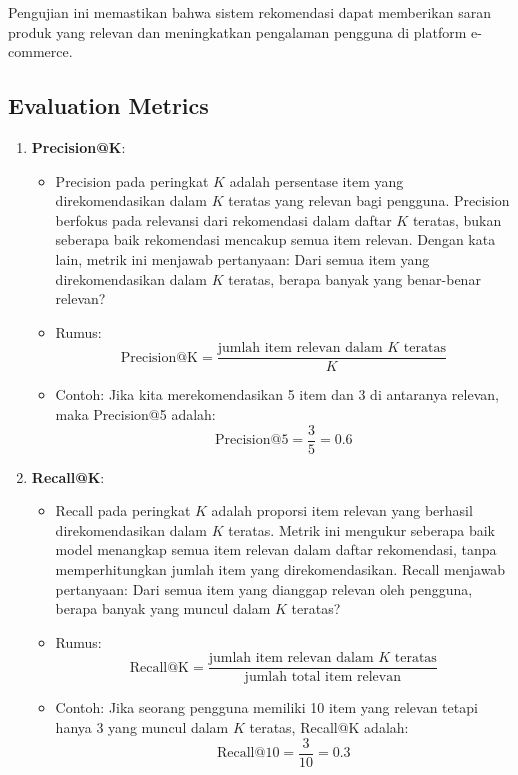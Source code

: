 \documentclass[journal,article,submit,pdftex,moreauthors]{Definitions/mdpi}
\begin{document}
Pengujian ini memastikan bahwa sistem rekomendasi dapat memberikan saran produk yang relevan dan meningkatkan pengalaman pengguna di platform e-commerce.



\subsection{Evaluation Metrics}

\begin{enumerate}
    \item \textbf{Precision@K}:
    \begin{itemize}
        \item Precision pada peringkat \( K \) adalah persentase item yang direkomendasikan dalam \( K \) teratas yang relevan bagi pengguna. Precision berfokus pada relevansi dari rekomendasi dalam daftar \( K \) teratas, bukan seberapa baik rekomendasi mencakup semua item relevan. Dengan kata lain, metrik ini menjawab pertanyaan: Dari semua item yang direkomendasikan dalam \( K \) teratas, berapa banyak yang benar-benar relevan?
        \item Rumus:
        \[
        \text{Precision@K} = \frac{\text{jumlah item relevan dalam } K \text{ teratas}}{K}
        \]
        \item Contoh: Jika kita merekomendasikan 5 item dan 3 di antaranya relevan, maka Precision@5 adalah:
        \[
        \text{Precision@5} = \frac{3}{5} = 0.6
        \]
    \end{itemize}

    \item \textbf{Recall@K}:
    \begin{itemize}
        \item Recall pada peringkat \( K \) adalah proporsi item relevan yang berhasil direkomendasikan dalam \( K \) teratas. Metrik ini mengukur seberapa baik model menangkap semua item relevan dalam daftar rekomendasi, tanpa memperhitungkan jumlah item yang direkomendasikan. Recall menjawab pertanyaan: Dari semua item yang dianggap relevan oleh pengguna, berapa banyak yang muncul dalam \( K \) teratas?
        \item Rumus:
        \[
        \text{Recall@K} = \frac{\text{jumlah item relevan dalam } K \text{ teratas}}{\text{jumlah total item relevan}}
        \]
        \item Contoh: Jika seorang pengguna memiliki 10 item yang relevan tetapi hanya 3 yang muncul dalam \( K \) teratas, Recall@K adalah:
        \[
        \text{Recall@10} = \frac{3}{10} = 0.3
        \]
    \end{itemize}


\end{enumerate}
\end{document}
